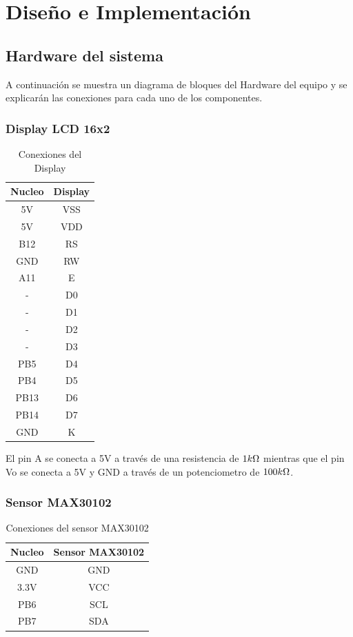 \section{Diseño e Implementación}
\subsection{Hardware del sistema}
A continuación se muestra un diagrama de bloques del Hardware del equipo y se explicarán las conexiones para cada uno de los componentes. 
\subsubsection{Display LCD 16x2}
\begin{table}[H]
\centering
\begin{tabular}{|c|c|}
\hline
Nucleo & Display\\ \hline
5V& VSS \\ \hline
5V & VDD \\ \hline
B12 & RS \\ \hline
GND & RW \\ \hline
A11 & E \\ \hline
- & D0 \\ \hline
- & D1 \\ \hline
- & D2 \\ \hline
- & D3 \\ \hline
PB5 & D4 \\ \hline
PB4 & D5 \\ \hline
PB13 & D6 \\ \hline
PB14 & D7 \\ \hline
GND & K \\ \hline
\end{tabular}
\caption{Conexiones del Display}
\end{table}
El pin A se conecta a 5V a través de una resistencia de $1k\ohm$ mientras que el pin Vo se conecta a 5V y GND a través de un potenciometro de $100k\ohm$.
\subsubsection{Sensor MAX30102}
\begin{table}[H]
\centering
\begin{tabular}{|c|c|}
\hline
Nucleo & Sensor MAX30102 \\ \hline
GND & GND \\ \hline
3.3V & VCC \\ \hline
PB6 & SCL \\ \hline
PB7 & SDA \\ \hline
\end{tabular}
\caption{Conexiones del sensor MAX30102}
\end{table}

